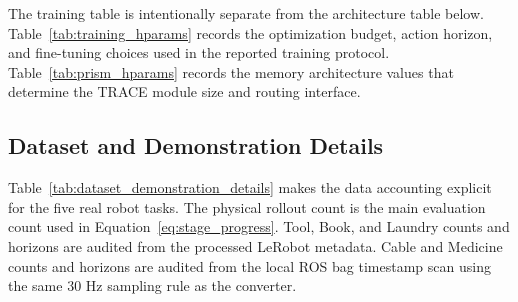 \documentclass{article}
\begin{document}
The training table is intentionally separate from the architecture table below. Table~\ref{tab:training_hparams} records the optimization budget, action horizon, and fine-tuning choices used in the reported training protocol. Table~\ref{tab:prism_hparams} records the memory architecture values that determine the TRACE module size and routing interface.

\subsection{Dataset and Demonstration Details}
\label{app:dataset_demonstration_details}

Table~\ref{tab:dataset_demonstration_details} makes the data accounting explicit for the five real robot tasks. The physical rollout count is the main evaluation count used in Equation~\ref{eq:stage_progress}. Tool, Book, and Laundry counts and horizons are audited from the processed LeRobot metadata. Cable and Medicine counts and horizons are audited from the local ROS bag timestamp scan using the same $30$ Hz sampling rule as the converter.

\begin{table}[H]
    \centering
    \caption{Dataset scale and demonstration details for the real robot evaluation protocol reported in this paper.}
    \label{tab:dataset_demonstration_details}
    \setlength{\tabcolsep}{2.4pt}
    \renewcommand{\arraystretch}{1.08}
\end{table}
\end{document}
